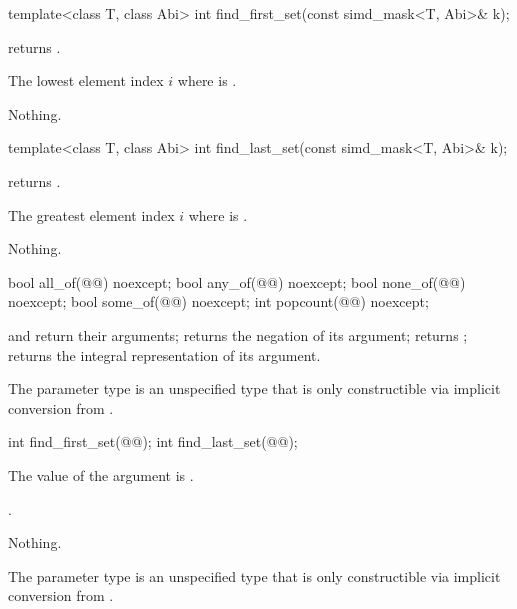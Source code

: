 \begin{itemdecl}
template<class T, class Abi> int find_first_set(const simd_mask<T, Abi>& k);
\end{itemdecl}

\begin{itemdescr}
  \pnum\requires
   returns .

  \pnum\returns
  The lowest element index $i$ where  is .

  \pnum\throws Nothing.
\end{itemdescr}

\begin{itemdecl}
template<class T, class Abi> int find_last_set(const simd_mask<T, Abi>& k);
\end{itemdecl}

\begin{itemdescr}
  \pnum\requires
   returns .

  \pnum\returns
  The greatest element index $i$ where  is .

  \pnum\throws Nothing.
\end{itemdescr}

\begin{itemdecl}
bool all_of(@@) noexcept;
bool any_of(@@) noexcept;
bool none_of(@@) noexcept;
bool some_of(@@) noexcept;
int popcount(@@) noexcept;
\end{itemdecl}

\begin{itemdescr}
  \pnum\returns
   and  return their arguments;  returns the negation of its argument;  returns ;  returns the integral representation of its argument.

  \pnum\remarks
  The parameter type  is an unspecified type that is only constructible via implicit conversion from .
\end{itemdescr}

\begin{itemdecl}
int find_first_set(@@);
int find_last_set(@@);
\end{itemdecl}

\begin{itemdescr}
  \pnum\requires
  The value of the argument is .

  \pnum\returns
  .

  \pnum\throws Nothing.

  \pnum\remarks
  The parameter type  is an unspecified type that is only constructible via implicit conversion from .
\end{itemdescr}

